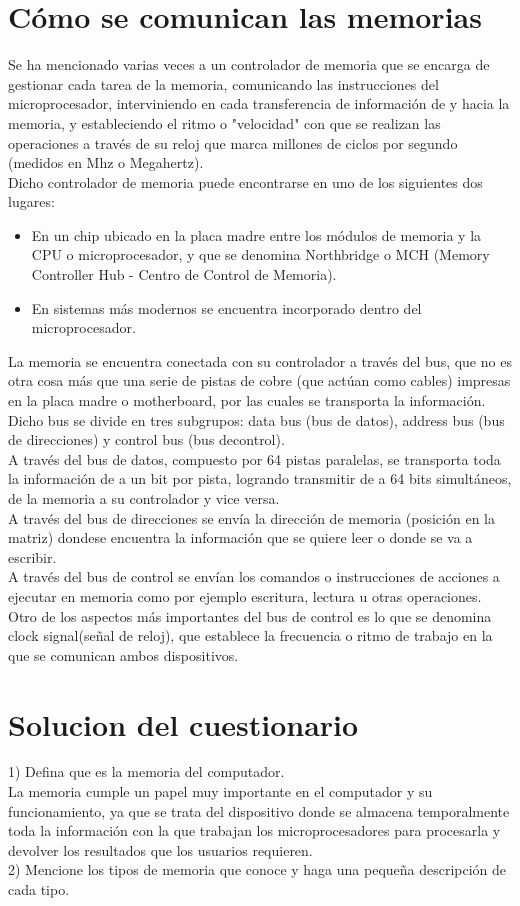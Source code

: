\documentclass{article}
\begin{document}
\section*{Cómo se comunican las memorias}
Se ha mencionado varias veces a un controlador de memoria que se encarga de gestionar cada
tarea de la memoria, comunicando las instrucciones del microprocesador, interviniendo en
cada transferencia de información de y hacia la memoria, y estableciendo el ritmo o "velocidad"
con que se realizan las operaciones a través de su reloj que marca millones de ciclos por
segundo (medidos en Mhz o Megahertz).\\[0.1cm]
Dicho controlador de memoria puede encontrarse en uno de los siguientes dos lugares:
\begin{itemize}
\item En un chip ubicado en la placa madre entre los módulos de memoria y la CPU o
microprocesador, y que se denomina Northbridge o MCH (Memory Controller Hub -
Centro de Control de Memoria).
\item En sistemas más modernos se encuentra incorporado dentro del microprocesador.
\end{itemize}
La memoria se encuentra conectada con su controlador a través del bus, que no es otra cosa
más que una serie de pistas de cobre (que actúan como cables) impresas en la placa madre o
motherboard, por las cuales se transporta la información. Dicho bus se divide en tres
subgrupos: data bus (bus de datos), address bus (bus de direcciones) y control bus (bus decontrol).\\[0.1cm]
A través del bus de datos, compuesto por 64 pistas paralelas, se transporta toda la información
de a un bit por pista, logrando transmitir de a 64 bits simultáneos, de la memoria a su controlador y vice versa.\\[0.1cm]
A través del bus de direcciones se envía la dirección de memoria (posición en la matriz) dondese encuentra la información que se quiere leer o donde se va a escribir.\\[0.1cm]
A través del bus de control se envían los comandos o instrucciones de acciones a ejecutar en memoria como por ejemplo escritura, lectura u otras operaciones. Otro de los aspectos más importantes del bus de control es lo que se denomina clock signal(señal de reloj), que establece la frecuencia o ritmo de trabajo en la que se comunican ambos dispositivos.
\section*{Solucion del cuestionario}
1) Defina que es la memoria del computador.\\[0.1cm]
La memoria cumple un papel muy importante en el computador y su funcionamiento,
ya que se trata del dispositivo donde se almacena temporalmente
toda la información con la que trabajan los microprocesadores para procesarla
y devolver los resultados que los usuarios requieren.\\[0.5cm]
2) Mencione los tipos de memoria que conoce y haga una pequeña descripción de cada tipo.\\[0.1cm]
\end{document}
